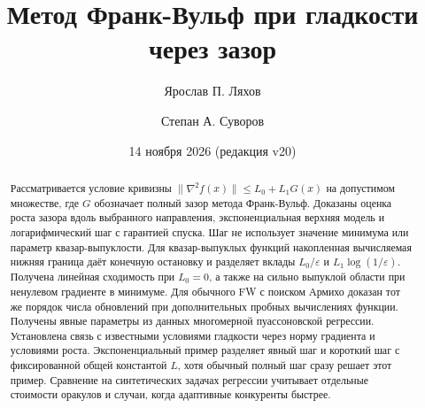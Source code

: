 \documentclass[a4paper,11pt]{article}
\title{Метод Франк-Вульф при гладкости через зазор}
\author{Ярослав П. Ляхов \and Степан А. Суворов}
\date{14 ноября 2026 (редакция v20)}
\begin{document}
\maketitle
\begin{abstract}
Рассматривается условие кривизны
$\|\nabla^2f(x)\|\le L_0+L_1G(x)$ на допустимом множестве,
где $G$ обозначает полный зазор метода Франк-Вульф.
Доказаны оценка роста зазора вдоль выбранного направления,
экспоненциальная верхняя модель и логарифмический шаг с гарантией спуска.
Шаг не использует значение минимума или параметр квазар-выпуклости.
Для квазар-выпуклых функций накопленная вычисляемая нижняя граница
даёт конечную остановку и разделяет вклады
$L_0/\varepsilon$ и $L_1\log(1/\varepsilon)$.
Получена линейная сходимость при $L_0=0$, а также на сильно выпуклой
области при ненулевом градиенте в минимуме.
Для обычного FW с поиском Армихо доказан тот же порядок числа обновлений
при дополнительных пробных вычислениях функции. Получены явные параметры
из данных многомерной пуассоновской регрессии. Установлена связь с известными
условиями гладкости через норму градиента и условиями роста.
Экспоненциальный пример разделяет явный шаг и короткий шаг с фиксированной
общей константой $L$, хотя обычный полный шаг сразу решает этот пример.
Сравнение на синтетических задачах регрессии учитывает отдельные стоимости
оракулов и случаи, когда адаптивные конкуренты быстрее.
\end{abstract}









\end{document}
